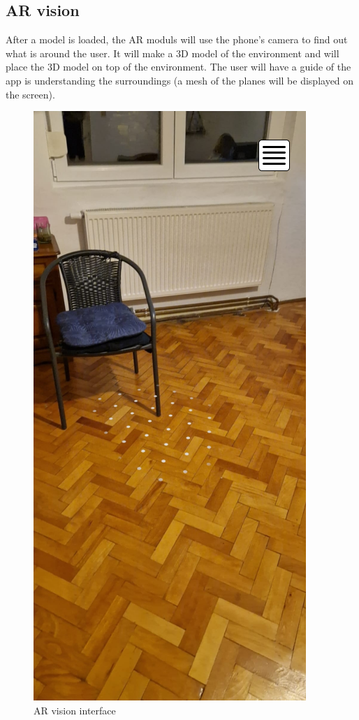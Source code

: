 \subsection{AR vision}
After a model is loaded, the AR moduls will use the phone's camera to find out what is around the user. It will make a 3D model of the environment and will place the 3D model on top of the environment. The user will have a guide of the app is understanding the surroundings (a mesh of the planes will be displayed on the screen).
\begin{figure}[h!]
    \begin{center}
        \includegraphics[scale=0.5]{img/App_mock/iPhone 14 - 5.png}
        \caption{AR vision interface}
        \label{fig:ar-vision}
    \end{center}
\end{figure}

